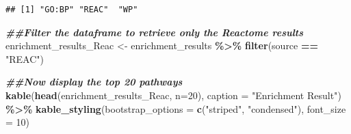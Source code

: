 \documentclass[
]{book}
\newenvironment{Shaded}{\begin{snugshade}}{\end{snugshade}}
\newcommand{\AttributeTok}[1]{\textcolor[rgb]{0.13,0.29,0.53}{#1}}
\newcommand{\DecValTok}[1]{\textcolor[rgb]{0.00,0.00,0.81}{#1}}
\newcommand{\DocumentationTok}[1]{\textcolor[rgb]{0.56,0.35,0.01}{\textbf{\textit{#1}}}}
\newcommand{\FunctionTok}[1]{\textcolor[rgb]{0.13,0.29,0.53}{\textbf{#1}}}
\newcommand{\NormalTok}[1]{#1}
\newcommand{\OtherTok}[1]{\textcolor[rgb]{0.56,0.35,0.01}{#1}}
\newcommand{\SpecialCharTok}[1]{\textcolor[rgb]{0.81,0.36,0.00}{\textbf{#1}}}
\newcommand{\StringTok}[1]{\textcolor[rgb]{0.31,0.60,0.02}{#1}}
\begin{document}
\begin{verbatim}
## [1] "GO:BP" "REAC"  "WP"
\end{verbatim}

\begin{Shaded}
\begin{Highlighting}[]
\DocumentationTok{\#\#Filter the dataframe to retrieve only the Reactome results}
\NormalTok{enrichment\_results\_Reac }\OtherTok{\textless{}{-}}\NormalTok{ enrichment\_results }\SpecialCharTok{\%\textgreater{}\%}
  \FunctionTok{filter}\NormalTok{(source }\SpecialCharTok{==} \StringTok{"REAC"}\NormalTok{)}

\DocumentationTok{\#\#Now display the top 20 pathways}
\FunctionTok{kable}\NormalTok{(}\FunctionTok{head}\NormalTok{(enrichment\_results\_Reac, }\AttributeTok{n=}\DecValTok{20}\NormalTok{), }\AttributeTok{caption =} \StringTok{"Enrichment Result"}\NormalTok{) }\SpecialCharTok{\%\textgreater{}\%}
\FunctionTok{kable\_styling}\NormalTok{(}\AttributeTok{bootstrap\_options =} \FunctionTok{c}\NormalTok{(}\StringTok{"striped"}\NormalTok{, }\StringTok{"condensed"}\NormalTok{), }\AttributeTok{font\_size =} \DecValTok{10}\NormalTok{)}
\end{Highlighting}
\end{Shaded}
\end{document}
